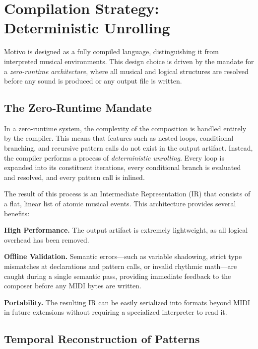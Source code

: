 \section{Compilation Strategy: Deterministic Unrolling}\label{sec:compilation-strategy}

Motivo is designed as a fully compiled language, distinguishing it from interpreted musical environments.
This design choice is driven by the mandate for a \textit{zero-runtime architecture}, where all musical and logical
structures are resolved before any sound is produced or any output file is written.

\subsection{The Zero-Runtime Mandate}\label{detail-subsec:the-zero-runtime-mandate}

In a zero-runtime system, the complexity of the composition is handled entirely by the compiler.
This means that features such as nested loops, conditional branching, and recursive pattern calls do not exist in the
output artifact.
Instead, the compiler performs a process of \textit{deterministic unrolling}.
Every loop is expanded into its constituent iterations, every conditional branch is evaluated and resolved, and every
pattern call is inlined.

The result of this process is an Intermediate Representation (IR) that consists of a flat, linear list of atomic musical
events.
This architecture provides several benefits:

\noindent \textbf{High Performance.} The output artifact is extremely lightweight, as all logical overhead has been
removed.

\noindent \textbf{Offline Validation.} Semantic errors---such as variable shadowing, strict type mismatches at
declarations and pattern calls, or invalid rhythmic math---are caught during a single semantic pass, providing
immediate feedback to the composer before any MIDI bytes are written.

\noindent \textbf{Portability.} The resulting IR can be easily serialized into formats beyond MIDI in future extensions
without requiring a specialized interpreter to read it.

\subsection{Temporal Reconstruction of Patterns}\label{detail-subsec:temporal-reconstruction-of-patterns}

